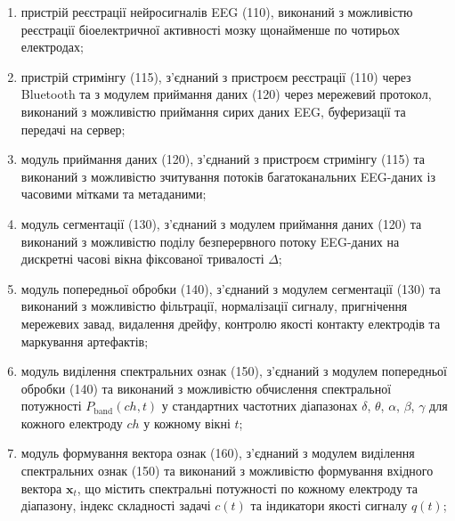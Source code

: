 \documentclass[12pt,a4paper]{article}
\begin{document}
\begin{enumerate}

\def\labelenumi{(\roman{enumi})}

\item

  пристрій реєстрації нейросигналів EEG (110), виконаний з можливістю реєстрації біоелектричної активності мозку щонайменше по чотирьох електродах;

\item

  пристрій стримінгу (115), з'єднаний з пристроєм реєстрації (110) через Bluetooth та з модулем приймання даних (120) через мережевий протокол, виконаний з можливістю приймання сирих даних EEG, буферизації та передачі на сервер;

\item

  модуль приймання даних (120), з'єднаний з пристроєм стримінгу (115) та виконаний з можливістю зчитування потоків багатоканальних EEG-даних із часовими мітками та метаданими;

\item

  модуль сегментації (130), з'єднаний з модулем приймання даних (120) та виконаний з можливістю поділу безперервного потоку EEG-даних на дискретні часові вікна фіксованої тривалості \(\Delta\);

\item

  модуль попередньої обробки (140), з'єднаний з модулем сегментації (130) та виконаний з можливістю фільтрації, нормалізації сигналу, пригнічення мережевих завад, видалення дрейфу, контролю якості контакту електродів та маркування артефактів;

\item

  модуль виділення спектральних ознак (150), з'єднаний з модулем попередньої обробки (140) та виконаний з можливістю обчислення спектральної потужності \(P_{\text{band}}(ch, t)\) у стандартних частотних діапазонах \(\delta\), \(\theta\), \(\alpha\), \(\beta\), \(\gamma\) для кожного електроду \(ch\) у кожному вікні \(t\);

\item

  модуль формування вектора ознак (160), з'єднаний з модулем виділення спектральних ознак (150) та виконаний з можливістю формування вхідного вектора \(\mathbf{x}_t\), що містить спектральні потужності по кожному електроду та діапазону, індекс складності задачі \(c(t)\) та індикатори якості сигналу \(q(t)\);


\end{enumerate}
\end{document}
